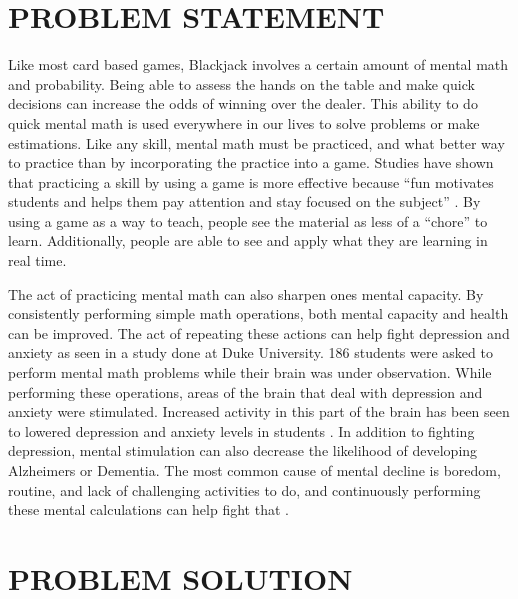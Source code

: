 \documentclass[12pt]{article}
\begin{document}
\section{PROBLEM STATEMENT}
Like most card based games, Blackjack involves a certain amount of mental math and probability. Being able to assess the hands on the table and make quick decisions can increase the odds of winning over the dealer. This ability to do quick mental math is used everywhere in our lives to solve problems or make estimations. Like any skill, mental math must be practiced, and what better way to practice than by incorporating the practice into a game. Studies have shown that practicing a skill by using a game is more effective because “fun motivates students and helps them pay attention and stay focused on the subject” \cite{games_2018}. By using a game as a way to teach, people see the material as less of a “chore” to learn. Additionally, people are able to see and apply what they are learning in real time. 

The act of practicing mental math can also sharpen ones mental capacity. By consistently performing simple math operations, both mental capacity and health can be improved. The act of repeating these actions can help fight depression and anxiety as seen in a study done at Duke University. 186 students were asked to perform mental math problems while their brain was under observation. While performing these operations, areas of the brain that deal with depression and anxiety were stimulated. Increased activity in this part of the brain has been seen to lowered depression and anxiety levels in students \cite{dukeu}. In addition to fighting depression, mental stimulation can also decrease the likelihood of developing Alzheimers or Dementia. The most common cause of mental decline is boredom, routine, and lack of challenging activities to do, and continuously performing these mental calculations can help fight that \cite{turner_2019}.

\section{PROBLEM SOLUTION}
\end{document}
